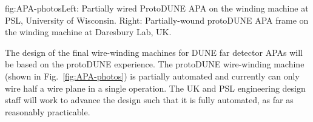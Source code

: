 \begin{dunefigure}{fig:APA-photos}{Left: Partially wired ProtoDUNE APA on the winding machine at PSL, University of Wisconsin. Right: Partially-wound protoDUNE APA frame on the winding machine at Daresbury Lab, UK.}
\setlength{\fboxsep}{0pt}
\setlength{\fboxrule}{0.5pt}
\end{dunefigure}


The design of the final wire-winding machines for DUNE far detector APAs will be based on the protoDUNE experience. The protoDUNE wire-winding machine (shown in Fig.~\ref{fig:APA-photos}) is partially automated and currently can only wire half a wire plane in a single operation. The UK and PSL engineering design staff will work to advance the design such that it is fully automated, as far as reasonably practicable.


